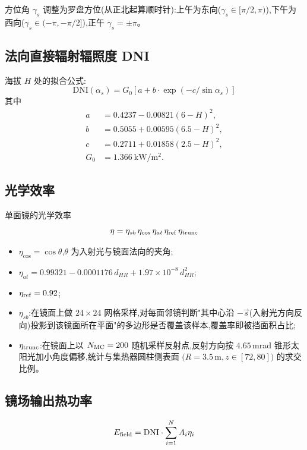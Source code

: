 \documentclass[UTF8,a4paper,12pt]{ctexart}
\begin{document}
方位角 $\gamma_s$ 调整为罗盘方位(从正北起算顺时针):上午为东向($\gamma_s\in[\pi/2,\pi)$),下午为西向($\gamma_s\in(-\pi,-\pi/2]$),正午 $\gamma_s=\pm\pi$。

\subsection{法向直接辐射辐照度 DNI}
海拔 $H$ 处的拟合公式:
\begin{equation}
\mathrm{DNI}(\alpha_s) = G_0\left[a + b\cdot \exp(-c/\sin\alpha_s)\right]
\label{eq:dni}
\end{equation}
其中
\begin{align*}
a &= 0.4237 - 0.00821(6-H)^2,\\
b &= 0.5055 + 0.00595(6.5-H)^2,\\
c &= 0.2711 + 0.01858(2.5-H)^2,\\
G_0 &= 1.366\ \mathrm{kW/m^2}.
\end{align*}

\subsection{光学效率}
单面镜的光学效率
\begin{equation}
\eta = \eta_{sb}\,\eta_{\cos}\,\eta_{at}\,\eta_{\rm ref}\,\eta_{\rm trunc}
\end{equation}

\begin{itemize}[leftmargin=2em]
  \item $\eta_{\cos}=\cos\theta$,$\theta$ 为入射光与镜面法向的夹角;
  \item $\eta_{at}=0.99321 - 0.0001176\,d_{HR} + 1.97\times 10^{-8}\,d_{HR}^2$;
  \item $\eta_{\rm ref}=0.92$;
  \item $\eta_{sb}$:在镜面上做 $24\times 24$ 网格采样,对每面邻镜判断"其中心沿 $-\vec{s}$(入射光方向反向)投影到该镜面所在平面"的多边形是否覆盖该样本,覆盖率即被挡面积占比;
  \item $\eta_{\rm trunc}$:在镜面上以 $N_{\rm MC}=200$ 随机采样反射点,反射方向按 $4.65$\,mrad 锥形太阳光加小角度偏移,统计与集热器圆柱侧表面 $(R=3.5$\,m$, z\in[72,80])$ 的求交比例。
\end{itemize}

\subsection{镜场输出热功率}
\begin{equation}
E_{\rm field} = \mathrm{DNI}\cdot \sum_{i=1}^N A_i \eta_i
\end{equation}
\end{document}
